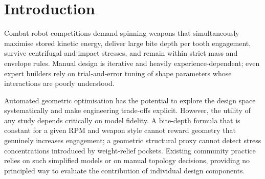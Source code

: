 \documentclass[10pt,twocolumn]{article}
\begin{document}
\section{Introduction}
\label{sec:intro}

Combat robot competitions demand spinning weapons that simultaneously maximise
stored kinetic energy, deliver large bite depth per tooth engagement, survive
centrifugal and impact stresses, and remain within strict mass and envelope
rules.  Manual design is iterative and heavily experience-dependent; even
expert builders rely on trial-and-error tuning of shape parameters whose
interactions are poorly understood.

Automated geometric optimisation has the potential to explore the design space
systematically and make engineering trade-offs explicit.  However, the utility
of any study depends critically on model fidelity.  A bite-depth formula that
is constant for a given RPM and weapon style cannot reward geometry that
genuinely increases engagement; a geometric structural proxy cannot detect
stress concentrations introduced by weight-relief pockets.  Existing
community practice relies on such simplified models or on manual topology
decisions, providing no principled way to evaluate the contribution of
individual design components.
\end{document}

